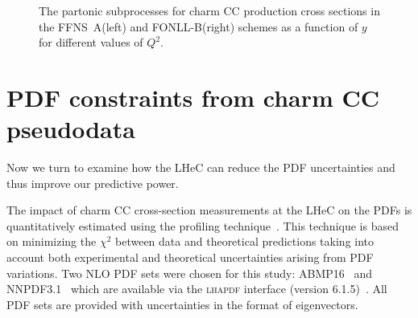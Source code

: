 \documentclass[pdftex,twocolumn,epjc3]{svjour3}          %
\newcommand{\abmp} {ABMP16\xspace}
\newcommand{\nnpdf} {NNPDF3.1\xspace}
\newcommand{\chisq}{\ensuremath{\chi^2}\xspace}
\newcommand{\lhapdf} {{\textsc{lhapdf}}\xspace}
\newcommand{\fonll} {{FONLL-B}\xspace}
\newcommand{\ffns} {{FFNS~A}\xspace}
\begin{document}
\begin{figure}
  \centering
  \caption{The partonic subprocesses for charm CC production cross
    sections in the \ffns (left) and \fonll (right) schemes as a
    function of $y$ for different values of $Q^2$.}
  \label{fig:partonic-y}
\end{figure}

\section{PDF constraints from charm CC pseudodata}
\label{sec:PDF}

Now we turn to examine how the LHeC can reduce the PDF uncertainties
and thus improve our predictive power.

The impact of charm CC cross-section measurements at the LHeC on the
PDFs is quantitatively estimated using the profiling
technique~\cite{Paukkunen:2014zia}. This technique is based on
minimizing the \chisq between data and theoretical predictions taking
into account both experimental and theoretical uncertainties arising
from PDF variations. Two NLO PDF sets were chosen for this study:
\abmp~\cite{Alekhin:2018pai} and \nnpdf~\cite{Ball:2017nwa} which are
available via the \lhapdf interface (version
6.1.5)~\cite{Buckley:2014ana}. All PDF sets are provided with
uncertainties in the format of eigenvectors.
\end{document}
